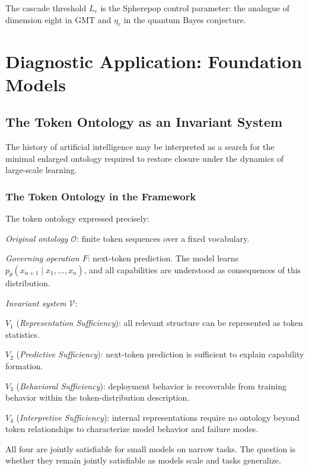 \documentclass[12pt,oneside]{book}
\theoremstyle{plain}
\theoremstyle{definition}
\theoremstyle{remark}
\newcommand{\Oold}{\mathcal{O}}
\begin{document}
The cascade threshold $L_c$ is the Spherepop control parameter: the analogue
of dimension eight in GMT and $\eta_c$ in the quantum Bayes conjecture.

\part{Diagnostic Application: Foundation Models}

\chapter{The Token Ontology as an Invariant System}

\epigraph{The history of artificial intelligence may be interpreted as a
search for the minimal enlarged ontology required to restore closure
under the dynamics of large-scale learning.}{}

\section{The Token Ontology in the Framework}

The token ontology expressed precisely:

\emph{Original ontology $\Oold$}: finite token sequences over a fixed vocabulary.

\emph{Governing operation $F$}: next-token prediction.
The model learns $p_\theta(x_{n+1} \mid x_1, \ldots, x_n)$, and all
capabilities are understood as consequences of this distribution.

\emph{Invariant system $\mathcal{V}$}:

$V_1$ (\emph{Representation Sufficiency}): all relevant structure can be
represented as token statistics.

$V_2$ (\emph{Predictive Sufficiency}): next-token prediction is sufficient
to explain capability formation.

$V_3$ (\emph{Behavioral Sufficiency}): deployment behavior is recoverable
from training behavior within the token-distribution description.

$V_4$ (\emph{Interpretive Sufficiency}): internal representations require
no ontology beyond token relationships to characterize model behavior
and failure modes.

All four are jointly satisfiable for small models on narrow tasks. The
question is whether they remain jointly satisfiable as models scale and
tasks generalize.
\end{document}
